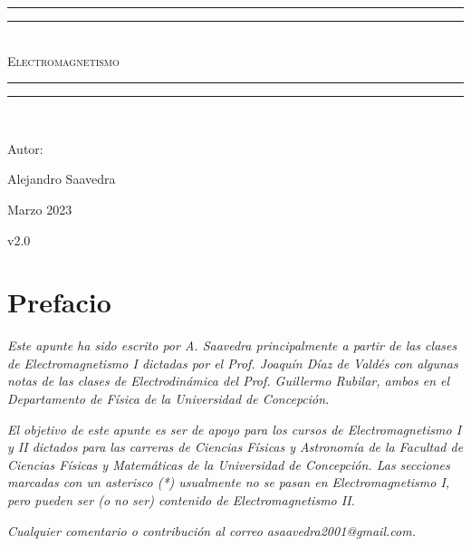 \documentclass[letterpaper,twoside,12pt]{report}
\newlength{\drop}
\theoremstyle{definition}
\begin{document}
\sffamily

\begin{titlepage}
 \textheight
    \centering
    \vspace*{\baselineskip}
    \rule{\textwidth}{1.6pt}\vspace*{-\baselineskip}\vspace*{2pt}
    \rule{\textwidth}{0.4pt}\\[\baselineskip]
    {\scshape\Huge Electromagnetismo}\\[0.2\baselineskip]
    \rule{\textwidth}{0.4pt}\vspace*{-\baselineskip}\vspace{3.2pt}
    \rule{\textwidth}{1.6pt}\\[\baselineskip]
    {\Large Autor: \par}
{\Large Alejandro Saavedra \par}
\vfill
{\large Marzo 2023 \par}
{\large v2.0 \par}
\end{titlepage}

\chapter*{Prefacio}


\emph{Este apunte ha sido escrito  por A. Saavedra principalmente a partir de las clases de Electromagnetismo I dictadas por el Prof. Joaquín Díaz de Valdés con algunas notas de las clases de Electrodinámica del Prof. Guillermo Rubilar,  ambos en el Departamento de Física de la Universidad de Concepción.}

\emph{El objetivo de este apunte es ser de apoyo para los cursos de Electromagnetismo I y II dictados para las carreras de Ciencias Físicas y Astronomía de la Facultad de Ciencias Físicas y Matemáticas de la Universidad de Concepción. Las secciones marcadas con un asterisco (*) usualmente no se pasan en Electromagnetismo I, pero pueden ser (o no ser) contenido de Electromagnetismo II.}

\emph{Cualquier comentario o contribución al correo \textit{asaavedra2001@gmail.com}.}


\tableofcontents

\pagestyle{mystyle}








\nocite{*} %
\printbibliography[title={Referencias}]
\end{document}
